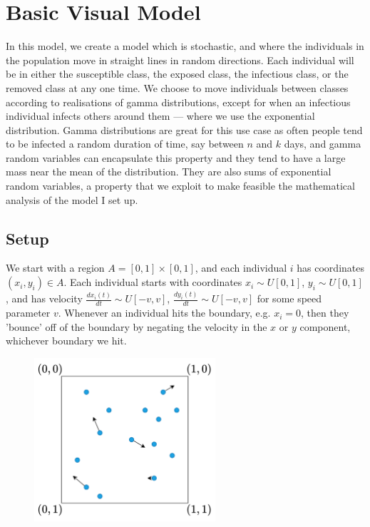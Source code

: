 \documentclass[11pt]{article}
\begin{document}
\section{Basic Visual Model}
In this model, we create a model which is stochastic, and where the individuals in the population move in straight lines in random directions. Each individual will be in either the susceptible class, the exposed class, the infectious class, or the removed class at any one time. We choose to move individuals between classes according to realisations of gamma distributions, except for when an infectious individual infects others around them — where we use the exponential distribution. Gamma distributions are great for this use case as often people tend to be infected a random duration of time, say between $n$ and $k$ days, and gamma random variables can encapsulate this property and they tend to have a large mass near the mean of the distribution. They are also sums of exponential random variables, a property that we exploit to make feasible the mathematical analysis of the model I set up.

\subsection{Setup}
We start with a region $A=[0,1]\times [0,1]$, and each individual $i$ has coordinates $(x_i, y_i)\in A$. Each individual starts with coordinates $x_i \sim U[0,1]$, $y_i \sim U[0,1]$, and has velocity $\frac{dx_i(t)}{dt} \sim U[-v,v]$, $\frac{dy_i(t)}{dt} \sim U[-v,v]$ for some speed parameter $v$. Whenever an individual hits the boundary, e.g. $x_i=0$, then they 'bounce' off of the boundary by negating the velocity in the $x$ or $y$ component, whichever boundary we hit.

\begin{figure}[H]
\label{BasicModelDiagram}
\begin{center}
\includegraphics[width=0.6\textwidth]{BasicModelDiagram1}
\end{center}
\end{figure}
\end{document}
